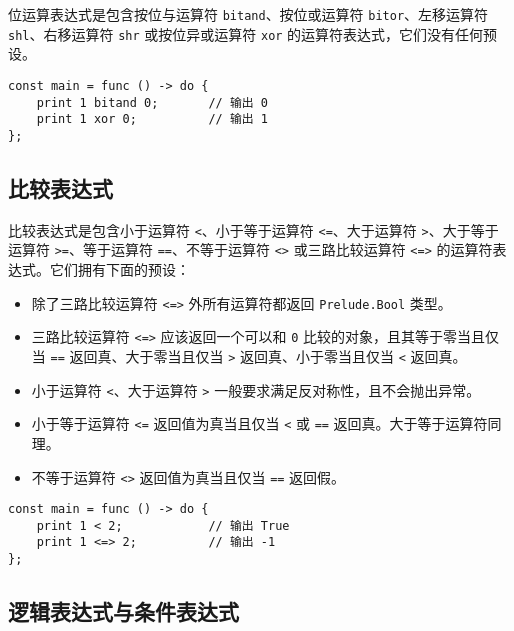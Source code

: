 位运算表达式是包含按位与运算符 \lstinline!bitand!、按位或运算符 \lstinline!bitor!、左移运算符 \lstinline!shl!、右移运算符 \lstinline!shr! 或按位异或运算符 \lstinline!xor! 的运算符表达式，它们没有任何预设。

\begin{lstlisting}
const main = func () -> do {
    print 1 bitand 0;       // 输出 0
    print 1 xor 0;          // 输出 1
};
\end{lstlisting}

\subsection{比较表达式}

比较表达式是包含小于运算符 \lstinline!<!、小于等于运算符 \lstinline!<=!、大于运算符 \lstinline!>!、大于等于运算符 \lstinline!>=!、等于运算符 \lstinline!==!、不等于运算符 \lstinline!<>! 或三路比较运算符 \lstinline!<=>! 的运算符表达式。它们拥有下面的预设：

\begin{itemize}
    \item 除了三路比较运算符 \lstinline!<=>! 外所有运算符都返回 \lstinline!Prelude.Bool! 类型。

    \item 三路比较运算符 \lstinline!<=>! 应该返回一个可以和 \lstinline!0! 比较的对象，且其等于零当且仅当 \lstinline!==! 返回真、大于零当且仅当 \lstinline!>! 返回真、小于零当且仅当 \lstinline!<! 返回真。
    
    \item 小于运算符 \lstinline!<!、大于运算符 \lstinline!>! 一般要求满足反对称性，且不会抛出异常。

    \item 小于等于运算符 \lstinline!<=! 返回值为真当且仅当 \lstinline!<! 或 \lstinline!==! 返回真。大于等于运算符同理。

    \item 不等于运算符 \lstinline!<>! 返回值为真当且仅当 \lstinline!==! 返回假。
\end{itemize}

\begin{lstlisting}
const main = func () -> do {
    print 1 < 2;            // 输出 True
    print 1 <=> 2;          // 输出 -1
};
\end{lstlisting}

\subsection{逻辑表达式与条件表达式}


